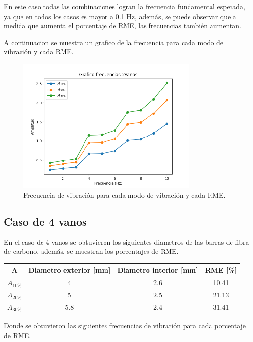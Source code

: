 En este caso todas las combinaciones logran la frecuencia fundamental esperada, ya que en todos los casos es mayor a 0.1 Hz, además, se puede observar que a medida que aumenta el porcentaje de RME, las frecuencias también aumentan.

A continuacion se muestra un grafico de la frecuencia para cada modo de vibración y cada RME. 

\begin{figure}[H]
    \centering
    \includegraphics[width=0.8\textwidth]{../grafico_frecuencias_2vanos.png}
    \caption{Frecuencia de vibración para cada modo de vibración y cada RME.}
\end{figure}

\subsection{Caso de 4 vanos}
En el caso de 4 vanos se obtuvieron los siguientes diametros de las barras de fibra de carbono, además, se muestran los porcentajes de RME.

\begin{table}[H]
    \centering
    \begin{tabular}{cccc}
    \toprule
     A & Diametro exterior [mm] & Diametro interior [mm] & RME [\%] \\
    \midrule
     $A_{10\%}$ &  4 &  2.6 &  10.41 \\
     $A_{20\%}$ &  5 &  2.5 &  21.13 \\
     $A_{30\%}$ &  5.8 &  2.4 &  31.41 \\
    \bottomrule
    \end{tabular}
\end{table}

Donde se obtuvieron las siguientes frecuencias de vibración para cada porcentaje de RME.

